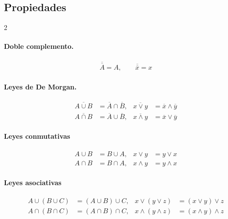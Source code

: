 \documentclass[11pt,a4paper]{article}   %
\newcommand{\compl}[1]{\overline{#1}}    %
\begin{document}
\subsection{Propiedades}

\begin{paracol}{2}
\paragraph{Doble complemento.}
\begin{align*}
\compl{\compl{A}}=A, \qquad
\overline{\overline{x}} = x
\end{align*}

\switchcolumn %

\paragraph{Leyes de De Morgan.}
\begin{align*}
\compl{A\cup B} &= \compl{A}\cap\compl{B}, & \overline{x\lor y} &= \overline{x} \land \overline{y} \\
\compl{A\cap B} &= \compl{A}\cup\compl{B}, & \overline{x\land y} &= \overline{x} \lor \overline{y}
\end{align*}

\switchcolumn %

\paragraph{Leyes conmutativas}
\begin{align*}
A \cup B &= B \cup A, & x \lor y &= y \lor x \\
A \cap B &= B \cap A, & x \land y &= y \land x
\end{align*}

\switchcolumn %

\paragraph{Leyes asociativas}
\begin{align*}
A \cup (B \cup C) &= (A \cup B) \cup C, & x \lor (y \lor z) &= (x \lor y) \lor z \\
A \cap (B \cap C) &= (A \cap B) \cap C, & x \land (y \land z) &= (x \land y) \land z
\end{align*}

\switchcolumn %


\end{paracol}
\end{document}
